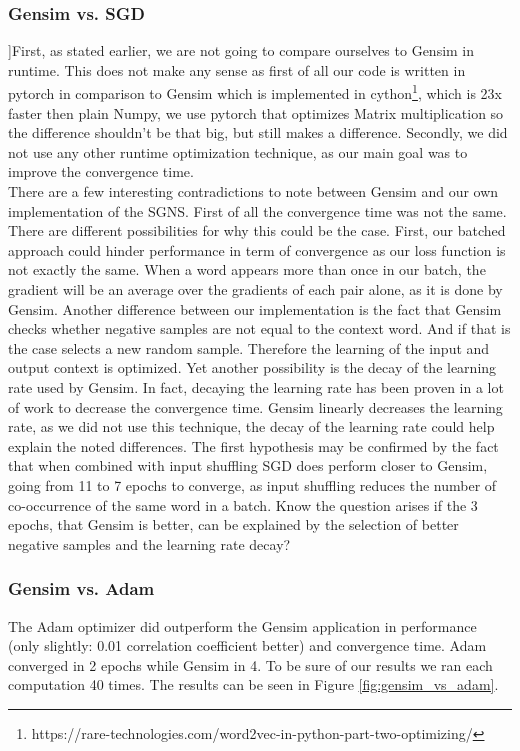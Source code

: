 \subsubsection{Gensim vs. SGD}
]First, as stated earlier, we are not going to compare ourselves to Gensim in runtime. This does not make any sense as first of all our code is written in pytorch in comparison to Gensim which is implemented in cython\footnote{https://rare-technologies.com/word2vec-in-python-part-two-optimizing/}, which is 23x faster then plain Numpy, we use pytorch that optimizes Matrix multiplication so the difference shouldn't be that big, but still makes a difference. Secondly, we did not use any other runtime optimization technique, as our main goal was to improve the convergence time.\\
There are a few interesting contradictions to note between Gensim and our own implementation of the SGNS. First of all the convergence time was not the same. There are different possibilities for why this could be the case. First, our batched approach could hinder performance in term of convergence as our loss function is not exactly the same. When a word appears more than once in our batch, the gradient will be an average over the gradients of each pair alone, as it is done by Gensim. Another difference between our implementation is the fact that Gensim checks whether negative samples are not equal to the context word. And if that is the case selects a new random sample. Therefore the learning of the input and output context is optimized. Yet another possibility is the decay of the learning rate used by Gensim. In fact, decaying the learning rate has been proven in a lot of work to decrease the convergence time. Gensim linearly decreases the learning rate, as we did not use this technique, the decay of the learning rate could help explain the noted differences.
The first hypothesis may be confirmed by the fact that when combined with input shuffling SGD does perform closer to Gensim, going from 11 to 7 epochs to converge, as input shuffling reduces the number of co-occurrence of the same word in a batch. Know the question arises if the 3 epochs, that Gensim is better, can be explained by the selection of better negative samples and the learning rate decay?

\subsubsection{Gensim vs. Adam}
The Adam optimizer did outperform the Gensim application in performance (only slightly: 0.01 correlation coefficient better) and convergence time. Adam converged in 2 epochs while Gensim in 4. To be sure of our results we ran each computation 40 times. The results can be  seen in Figure \ref{fig:gensim_vs_adam}.

